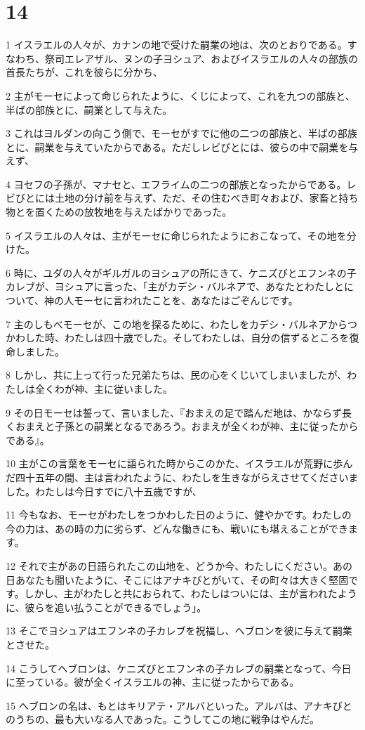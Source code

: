 \chapter{14}

\par 1 イスラエルの人々が、カナンの地で受けた嗣業の地は、次のとおりである。すなわち、祭司エレアザル、ヌンの子ヨシュア、およびイスラエルの人々の部族の首長たちが、これを彼らに分かち、
\par 2 主がモーセによって命じられたように、くじによって、これを九つの部族と、半ばの部族とに、嗣業として与えた。
\par 3 これはヨルダンの向こう側で、モーセがすでに他の二つの部族と、半ばの部族とに、嗣業を与えていたからである。ただしレビびとには、彼らの中で嗣業を与えず、
\par 4 ヨセフの子孫が、マナセと、エフライムの二つの部族となったからである。レビびとには土地の分け前を与えず、ただ、その住むべき町々および、家畜と持ち物とを置くための放牧地を与えたばかりであった。
\par 5 イスラエルの人々は、主がモーセに命じられたようにおこなって、その地を分けた。
\par 6 時に、ユダの人々がギルガルのヨシュアの所にきて、ケニズびとエフンネの子カレブが、ヨシュアに言った、「主がカデシ・バルネアで、あなたとわたしとについて、神の人モーセに言われたことを、あなたはごぞんじです。
\par 7 主のしもべモーセが、この地を探るために、わたしをカデシ・バルネアからつかわした時、わたしは四十歳でした。そしてわたしは、自分の信ずるところを復命しました。
\par 8 しかし、共に上って行った兄弟たちは、民の心をくじいてしまいましたが、わたしは全くわが神、主に従いました。
\par 9 その日モーセは誓って、言いました、『おまえの足で踏んだ地は、かならず長くおまえと子孫との嗣業となるであろう。おまえが全くわが神、主に従ったからである』。
\par 10 主がこの言葉をモーセに語られた時からこのかた、イスラエルが荒野に歩んだ四十五年の間、主は言われたように、わたしを生きながらえさせてくださいました。わたしは今日すでに八十五歳ですが、
\par 11 今もなお、モーセがわたしをつかわした日のように、健やかです。わたしの今の力は、あの時の力に劣らず、どんな働きにも、戦いにも堪えることができます。
\par 12 それで主があの日語られたこの山地を、どうか今、わたしにください。あの日あなたも聞いたように、そこにはアナキびとがいて、その町々は大きく堅固です。しかし、主がわたしと共におられて、わたしはついには、主が言われたように、彼らを追い払うことができるでしょう」。
\par 13 そこでヨシュアはエフンネの子カレブを祝福し、ヘブロンを彼に与えて嗣業とさせた。
\par 14 こうしてヘブロンは、ケニズびとエフンネの子カレブの嗣業となって、今日に至っている。彼が全くイスラエルの神、主に従ったからである。
\par 15 ヘブロンの名は、もとはキリアテ・アルバといった。アルバは、アナキびとのうちの、最も大いなる人であった。こうしてこの地に戦争はやんだ。

